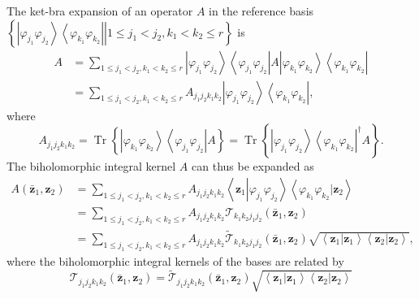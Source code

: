 \documentclass[aps,preprint]{revtex4}%
\begin{document}
The ket-bra expansion of an operator $A$ in the reference basis $\left\{
\left.  \left\vert \varphi_{j_{1}}\varphi_{j_{2}}\right\rangle \left\langle
\varphi_{k_{1}}\varphi_{k_{2}}\right\vert \right\vert 1\leq j_{1}<j_{2}%
,k_{1}<k_{2}\leq r\right\}  $ is
\begin{align}
A  &  =\sum_{1\leq j_{1}<j_{2},k_{1}<k_{2}\leq r}\left\vert \varphi_{j_{1}%
}\varphi_{j_{2}}\right\rangle \left\langle \varphi_{j_{1}}\varphi_{j_{2}%
}\right\vert A\left\vert \varphi_{k_{1}}\varphi_{k_{2}}\right\rangle
\left\langle \varphi_{k_{1}}\varphi_{k_{2}}\right\vert \nonumber\\
&  =\sum_{1\leq j_{1}<j_{2},k_{1}<k_{2}\leq r}A_{j_{1}j_{2}k_{1}k_{2}%
}\left\vert \varphi_{j_{1}}\varphi_{j_{2}}\right\rangle \left\langle
\varphi_{k_{1}}\varphi_{k_{2}}\right\vert ,
\end{align}
where
\begin{equation}
A_{j_{1}j_{2}k_{1}k_{2}}=\operatorname*{Tr}\left\{  \left\vert \varphi_{k_{1}%
}\varphi_{k_{2}}\right\rangle \left\langle \varphi_{j_{1}}\varphi_{j_{2}%
}\right\vert A\right\}  =\operatorname*{Tr}\left\{  \left\vert \varphi_{j_{1}%
}\varphi_{j_{2}}\right\rangle \left\langle \varphi_{k_{1}}\varphi_{k_{2}%
}\right\vert ^{\dagger}A\right\}  .
\end{equation}
The biholomorphic integral kernel $A$ can thus be expanded as
\begin{align}
A\left(  \mathbf{\bar{z}}_{1},\mathbf{z}_{2}\right)   &  =\sum_{1\leq
j_{1}<j_{2},k_{1}<k_{2}\leq r}A_{j_{1}j_{2}k_{1}k_{2}}\left\langle
\mathbf{z}_{1}\left\vert \varphi_{j_{1}}\varphi_{j_{2}}\right.  \right\rangle
\left\langle \varphi_{k_{1}}\varphi_{k_{2}}\left\vert \mathbf{z}_{2}\right.
\right\rangle \nonumber\\
&  =\sum_{1\leq j_{1}<j_{2},k_{1}<k_{2}\leq r}A_{j_{1}j_{2}k_{1}k_{2}%
}\mathcal{T}_{k_{1}k_{2}j_{1}j_{2}}\left(  \mathbf{\bar{z}}_{1},\mathbf{z}%
_{2}\right) \nonumber\\
&  =\sum_{1\leq j_{1}<j_{2},k_{1}<k_{2}\leq r}A_{j_{1}j_{2}k_{1}k_{2}%
}\mathcal{\tilde{T}}_{k_{1}k_{2}j_{1}j_{2}}\left(  \mathbf{\bar{z}}%
_{1},\mathbf{z}_{2}\right)  \sqrt{\left\langle \mathbf{z}_{1}\left\vert
\mathbf{z}_{1}\right.  \right\rangle \left\langle \mathbf{z}_{2}\left\vert
\mathbf{z}_{2}\right.  \right\rangle },
\end{align}
where the biholomorphic integral kernels of the bases are related by
\begin{equation}
\mathcal{T}_{j_{1}j_{2}k_{1}k_{2}}\left(  \mathbf{\bar{z}}_{1},\mathbf{z}%
_{2}\right)  =\mathcal{\tilde{T}}_{j_{1}j_{2}k_{1}k_{2}}\left(  \mathbf{\bar
{z}}_{1},\mathbf{z}_{2}\right)  \sqrt{\left\langle \mathbf{z}_{1}\left\vert
\mathbf{z}_{1}\right.  \right\rangle \left\langle \mathbf{z}_{2}\left\vert
\mathbf{z}_{2}\right.  \right\rangle }%
\end{equation}
\end{document}

